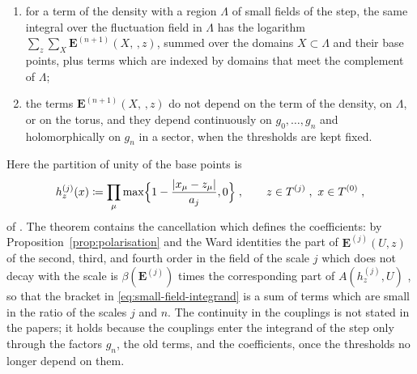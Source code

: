 \documentclass[11pt]{preprint}
\makeatletter
\DeclarePairedDelimiter{\abs}{\lvert}{\rvert}
\newcommand*{\bigcdot}{}%
\DeclareRobustCommand*{\bigcdot}{%
	\mathbin{\mathpalette\bigcdot@{}}%
}
\newcommand*{\bigcdot@scalefactor}{.7}
\newcommand*{\bigcdot@widthfactor}{1.15}
\newcommand*{\bigcdot@}[2]{%
	\sbox0{$#1\vcenter{}$}%
	\sbox2{$#1\cdot\m@th$}%
	\hbox to \bigcdot@widthfactor\wd2{%
		\hss
		\raise\ht0\hbox{%
			\scalebox{\bigcdot@scalefactor}{%
				\lower\ht0\hbox{$#1\bullet\m@th$}%
			}%
		}%
		\hss
	}%
}
\numberwithin{equation}{section}
\makeatother
\begin{document}
\begin{theorem}
\begin{enumerate}[label=(\roman*)]
\begin{equation}
\end{equation}
where $h^{(j)}_z$ is the partition of unity \eqref{eq:base-point-partition} and $A(h, U)$ is the action with the plaquette at $x$ weighted by $h(x)$;
\item for a term of the density with a region $\Lambda$ of small fields of the step, the same integral over the fluctuation field in $\Lambda$ has the logarithm $\sum_z\sum_X\mathbf E^{(n+1)}(X, \bigcdot\,, z)$, summed over the domains $X \subset \Lambda$ and their base points, plus terms which are indexed by domains that meet the complement of $\Lambda$;
\item the terms $\mathbf E^{(n+1)}(X, \bigcdot\,, z)$ do not depend on the term of the density, on $\Lambda$, or on the torus, and they depend continuously on $g_0, \dots, g_n$ and holomorphically on $g_n$ in a sector, when the thresholds are kept fixed.
\end{enumerate}
\end{theorem}

Here the partition of unity of the base points is
\begin{equation}\label{eq:base-point-partition}
    h^{(j)}_z(x) \coloneqq \prod_{\mu}\max\Bigl\{ 1 - \frac{\abs{x_\mu - z_\mu}}{a_j}, 0 \Bigr\}\;,
    \qquad
    z \in T^{(j)}\;,\ x \in T^{(0)}\;,
\end{equation}
of \cite[(3.40), p.~275]{BalabanCRE}. The theorem contains the cancellation which defines the coefficients: by Proposition~\ref{prop:polarisation} and the Ward identities the part of $\mathbf E^{(j)}(U, z)$ of the second, third, and fourth order in the field of the scale $j$ which does not decay with the scale is $\beta(\mathbf E^{(j)})$ times the corresponding part of $A(h^{(j)}_z, U)$ \cite[(3.57)--(3.67), pp.~281--283]{BalabanCRE}, so that the bracket in \eqref{eq:small-field-integrand} is a sum of terms which are small in the ratio of the scales $j$ and $n$. The continuity in the couplings is not stated in the papers; it holds because the couplings enter the integrand of the step only through the factors $g_n$, the old terms, and the coefficients, once the thresholds no longer depend on them.
\end{document}
